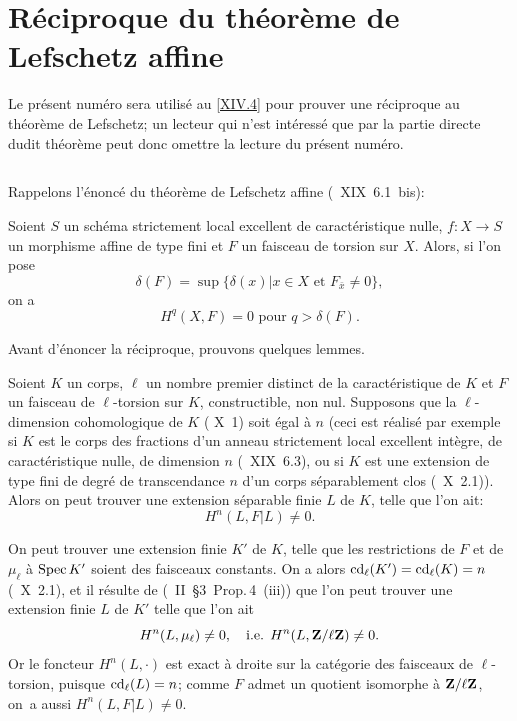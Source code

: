 \section{R\'eciproque du th\'eor\`eme de Lefschetz affine} \label{XIV.3}

Le pr\'esent num\'ero sera utilis\'e au \numero \ref{XIV.4} pour prouver une r\'eciproque au \og th\'eor\`eme de Lefschetz\fg; un lecteur qui n'est int\'eress\'e que par la partie directe dudit th\'eor\`eme peut donc omettre la lecture du pr\'esent num\'ero.

\subsection{} \label{XIV.3.1}

Rappelons l'\'enonc\'e du th\'eor\`eme de Lefschetz affine (~XIX~6.1~bis):

Soient $S$ un sch\'ema strictement local excellent de caract\'eristique nulle, $f:X\to S$ un morphisme affine de type fini et $F$ un faisceau de torsion sur $X$. Alors, si l'on pose
$$
\delta(F)=\sup\{\delta(x)|x\in X \text{ et } F_{\bar{x}} \neq 0\},
$$
on a
$$
H^q(X, F)=0 \text{ pour } q>\delta(F).
$$

Avant d'\'enoncer la r\'eciproque, prouvons quelques lemmes.

\begin{lemme} \label{XIV.3.2} Soient $K$ un corps, $\ell$ un nombre premier distinct de la caract\'eristique de $K$ et $F$ un faisceau de $\ell$-torsion sur $K$, constructible, non nul. Supposons que la $\ell$-dimension cohomologique de $K$ (\textup{ X~1}) soit \'egal \`a $n$ (ceci est r\'ealis\'e par exemple si $K$ est le corps des fractions d'un anneau strictement local excellent int\`egre, de caract\'eristique nulle, de dimension $n$ (\textup{~XIX~6.3}), ou si $K$ est une extension de type fini de degr\'e de transcendance $n$ d'un corps s\'eparablement clos (\textup{~X~2.1})). Alors on peut trouver une extension s\'eparable finie $L$ de $K$, telle que l'on ait:
$$H^n(L, F{|L}) \neq 0.
$$
\end{lemme}

On peut trouver une extension finie $K'$ de $K$, telle que les restrictions de $F$ et de $\mu_\ell$ \`a $\operatorname{Spec} K'$ soient des faisceaux constants. On a alors $\operatorname{cd}_{\ell}(K') = \operatorname{cd}_{\ell}(K) = n$ (~X~2.1), et il r\'esulte de (\cite{XIV.2}~II~\S 3~Prop.\,4~\textup{(iii)}) que l'on peut trouver une extension finie $L$ de $K'$ telle que l'on ait
$$
H^n(L, \mu_{\ell})\neq 0, \quad\text {i.e. } H^n(L, \mathbf{Z}/\ell\mathbf{Z}) \neq 0.
$$
Or le foncteur $H^n(L,\cdot)$ est exact \`a droite sur la cat\'egorie des faisceaux de $\ell$-torsion, puisque $\operatorname{cd}_{\ell}(L)=n$; comme $F$ admet un quotient isomorphe \`a $\mathbf{Z}/\ell\mathbf{Z}$, on~a aussi $H^n(L, F{|L}) \neq 0$.

